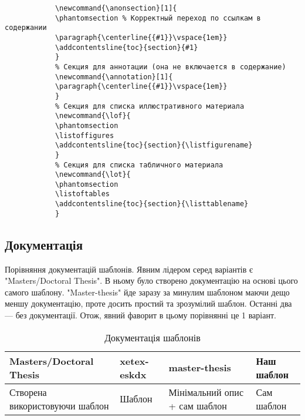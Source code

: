 \begin{lstlisting}
			\newcommand{\anonsection}[1]{
			\phantomsection % Корректный переход по ссылкам в содержании
			\paragraph{\centerline{{#1}}\vspace{1em}}
			\addcontentsline{toc}{section}{#1}
			}
			% Секция для аннотации (она не включается в содержание)
			\newcommand{\annotation}[1]{
			\paragraph{\centerline{{#1}}\vspace{1em}}
			}
			% Секция для списка иллюстративного материала
			\newcommand{\lof}{
			\phantomsection
			\listoffigures
			\addcontentsline{toc}{section}{\listfigurename}
			}
			% Секция для списка табличного материала
			\newcommand{\lot}{
			\phantomsection
			\listoftables
			\addcontentsline{toc}{section}{\listtablename}
			}
\end{lstlisting}

\subsection{Документація}

Порівняння документацій шаблонів. Явним лідером серед варіантів є "Masters/Doctoral Thesis". В ньому було створено документацію на основі цього самого шаблону. "Master-thesis" йде заразу за минулим шаблоном маючи дещо меншу документацію, проте досить простий та зрозумілий шаблон. Останні два --- без документації. Отож, явний фаворит в цьому порівнянні це 1 варіант.

\begin{table}[H]
	\caption{Документація шаблонів}\label{tab:tab5}
	\centering
	\begin{tabular}{C{0.2\textwidth}C{0.2\textwidth}C{0.2\textwidth}C{0.2\textwidth}}
		\toprule
		\textbf{Masters/Doctoral Thesis} & \textbf{xetex-eskdx} &  \textbf{master-thesis} & \textbf{Наш шаблон}\\
		\midrule
		Створена використовуючи шаблон & Шаблон & Мінімальний опис + сам шаблон & Сам шаблон \\ 
		\bottomrule
	\end{tabular}
\end{table}
